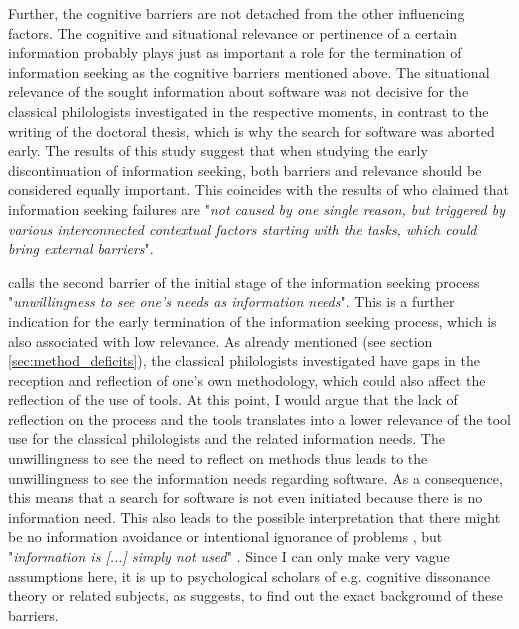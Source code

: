 \documentclass[12pt, a4paper, titlepage, oneside, abstract=true, toc=listof, toc=bibliography, BCOR=1cm]{scrreprt}
\begin{document}
{Further, the cognitive barriers are not detached from the other influencing factors. The cognitive and situational relevance \citep{Schamber1990} or pertinence \citep{Froehlich1994} of a certain information probably plays just as important a role for the termination of information seeking as the cognitive barriers mentioned above. The situational relevance of the sought information about software was not decisive for the classical philologists investigated in the respective moments, in contrast to the writing of the doctoral thesis, which is why the search for software was aborted early. The results of this study suggest that when studying the early discontinuation of information seeking, both barriers and relevance should be considered equally important. This coincides with the results of \citet[p. 454]{Wang2008} who claimed that information seeking failures are "\textit{not caused by one single reason, but triggered by various interconnected contextual factors starting with the tasks, which could bring external barriers}".  

\citet[p. 616]{Savolainen2015a} calls the second barrier of the initial stage of the information seeking process "\textit{unwillingness to see one's needs as information needs}". This is a further indication for the early termination of the information seeking process, which is also associated with low relevance. As already mentioned (see section \ref{sec:method_deficits}), the classical philologists investigated have gaps in the reception and reflection of one's own methodology, which could also affect the reflection of the use of tools. At this point, I would argue that the lack of reflection on the process and the tools translates into a lower relevance of the tool use for the classical philologists and the related information needs. The unwillingness to see the need to reflect on methods thus leads to the unwillingness to see the information needs regarding software. As a consequence, this means that a search for software is not even initiated because there is no information need. This also leads to the possible interpretation that there might be no information avoidance \citep[p. 97ff]{Case2007a} or intentional ignorance of problems \citep[p. 616]{Savolainen2015a}, but "\textit{information is [...] simply not used}" \citep[p. 100]{Case2007a}. Since I can only make very vague assumptions here, it is up to psychological scholars of e.g. cognitive dissonance theory \citep{Festinger1957} or related subjects, as \citet[p. 616]{Savolainen2015a} suggests, to find out the exact background of these barriers.

}
\end{document}
